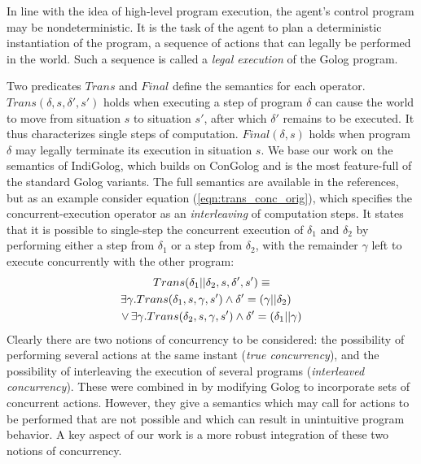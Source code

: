 In line with the idea of high-level program execution, the agent's
control program may be nondeterministic. It is the task of the agent
to plan a deterministic instantiation of the program, a sequence of
actions that can legally be performed in the world. Such a sequence
is called a \emph{legal execution} of the Golog program.

Two predicates $Trans$ and $Final$ define the semantics for each
operator. $Trans(\delta,s,\delta',s')$ holds when executing a step
of program $\delta$ can cause the world to move from situation $s$
to situation $s'$, after which $\delta'$ remains to be executed.
It thus characterizes single steps of computation. $Final(\delta,s)$
holds when program $\delta$ may legally terminate its execution in
situation $s$. We base our work on the semantics of IndiGolog, which
builds on ConGolog and is the most feature-full of the standard Golog
variants. The full semantics are available in the references, but
as an example consider equation (\ref{eqn:trans_conc_orig}), which
specifies the concurrent-execution operator as an \emph{interleaving}
of computation steps. It states that it is possible to single-step
the concurrent execution of $\delta_{1}$ and $\delta_{2}$ by performing
either a step from $\delta_{1}$ or a step from $\delta_{2}$, with
the remainder $\gamma$ left to execute concurrently with the other
program:\begin{multline}
Trans(\delta_{1}||\delta_{2},s,\delta',s')\equiv\\
\shoveright{\exists\gamma.Trans(\delta_{1},s,\gamma,s')\wedge\delta'=(\gamma||\delta_{2})}\\
\vee\,\exists\gamma.Trans(\delta_{2},s,\gamma,s')\wedge\delta'=(\delta_{1}||\gamma)\label{eqn:trans_conc_orig}\end{multline}
 Clearly there are two notions of concurrency to be considered: the
possibility of performing several actions at the same instant (\emph{true
concurrency}), and the possibility of interleaving the execution of
several programs (\emph{interleaved concurrency}). These were combined
in \cite{pinto99tcongolog} by modifying Golog to incorporate sets
of concurrent actions. However, they give a semantics which may call
for actions to be performed that are not possible and which can result
in unintuitive program behavior. A key aspect of our work is a more
robust integration of these two notions of concurrency.

